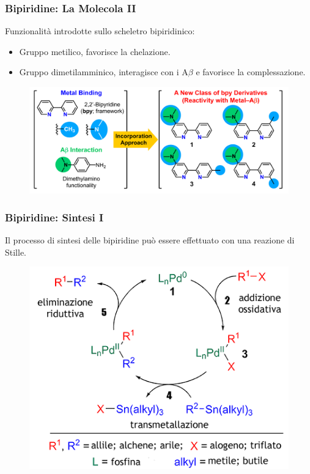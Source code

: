 \documentclass[9pt]{beamer}
\begin{document}
\begin{frame}
	\frametitle{Bipiridine: La Molecola II}
	
	Funzionalità introdotte sullo scheletro bipiridinico:
	\begin{itemize}
		\item Gruppo metilico, favorisce la chelazione.
		\item Gruppo dimetilamminico, interagisce con i A$\beta$ e favorisce la complessazione.
	\end{itemize}
	
	\begin{figure}
		\includegraphics[width=.8\textwidth]{immagini/bpy_mod.png}
	\end{figure}
	
\end{frame}


\begin{frame}
	\frametitle{Bipiridine: Sintesi I}
	Il processo di sintesi delle bipiridine può essere effettuato con una reazione di Stille.
	
	\begin{figure}
		\includegraphics[scale=0.7]{immagini/stille.png}
	\end{figure}
\end{frame}
\end{document}

